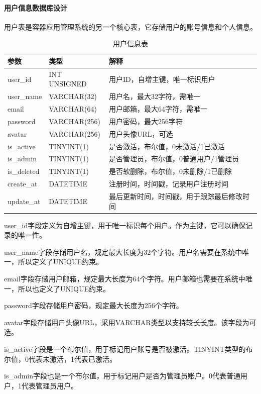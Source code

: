 \documentclass{HDU-Bachelor-Thesis}
\begin{document}
\paragraph{用户信息数据库设计}

用户表是容器应用管理系统的另一个核心表，它存储用户的账号信息和个人信息。

\begin{table}[htbp]
\caption{用户信息表}
\label{table:user}
\centering
\begin{tabular}{l|l|l}
\hline
\textbf{参数} & \textbf{类型} & \textbf{解释} \\ \hline
user\_id & INT UNSIGNED & 用户ID，自增主键，唯一标识用户\\
user\_name & VARCHAR(32) & 用户名，最大32字符，需唯一\\
email & VARCHAR(64) & 用户邮箱，最大64字符，需唯一\\
password & VARCHAR(256) & 用户密码，最大256字符\\
avatar & VARCHAR(256) & 用户头像URL，可选\\
is\_active & TINYINT(1) & 是否激活，布尔值，0未激活/1已激活\\
is\_admin& TINYINT(1) & 是否管理员，布尔值，0普通用户/1管理员\\
is\_deleted & TINYINT(1) & 是否软删除，布尔值，0未删除/1已删除\\
create\_at & DATETIME & 注册时间，时间戳，记录用户注册时间\\
update\_at & DATETIME & 最后更新时间，时间戳，用于跟踪最后修改时间\\
\hline
\end{tabular}
\end{table}

user\_id字段定义为自增主键，用于唯一标识每个用户。作为主键，它可以确保记录的唯一性。

user\_name字段存储用户名，规定最大长度为32个字符。用户名需要在系统中唯一，所以定义了UNIQUE约束。

email字段存储用户邮箱，规定最大长度为64个字符。用户邮箱也需要在系统中唯一，所以也定义了UNIQUE约束。

password字段存储用户密码，规定最大长度为256个字符。

avatar字段存储用户头像URL，采用VARCHAR类型以支持较长长度。该字段为可选。

is\_active字段是一个布尔值，用于标记用户账号是否被激活。TINYINT类型的布尔值，0代表未激活，1代表已激活。

is\_admin字段也是一个布尔值，用于标记用户是否为管理员账户。0代表普通用户，1代表管理员用户。
\end{document}
